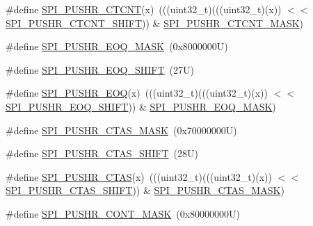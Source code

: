 \begin{DoxyCompactItemize}
\item 
\#define \mbox{\hyperlink{group___s_p_i___register___masks_ga4662cfbebbea26e0c427a9e4c310d9b2}{S\+P\+I\+\_\+\+P\+U\+S\+H\+R\+\_\+\+C\+T\+C\+NT}}(x)~(((uint32\+\_\+t)(((uint32\+\_\+t)(x)) $<$$<$ \mbox{\hyperlink{group___s_p_i___register___masks_ga7db8f0d7ae83f27f34eafd5e4d993ed1}{S\+P\+I\+\_\+\+P\+U\+S\+H\+R\+\_\+\+C\+T\+C\+N\+T\+\_\+\+S\+H\+I\+FT}})) \& \mbox{\hyperlink{group___s_p_i___register___masks_gad9e8859d590a59f5e208f5f4a2c8b873}{S\+P\+I\+\_\+\+P\+U\+S\+H\+R\+\_\+\+C\+T\+C\+N\+T\+\_\+\+M\+A\+SK}})
\item 
\#define \mbox{\hyperlink{group___s_p_i___register___masks_ga997edfebb20bfe6a385f018eb9a8a8fb}{S\+P\+I\+\_\+\+P\+U\+S\+H\+R\+\_\+\+E\+O\+Q\+\_\+\+M\+A\+SK}}~(0x8000000\+U)
\item 
\#define \mbox{\hyperlink{group___s_p_i___register___masks_ga81e193cbd4602af43cd59a35e56fa958}{S\+P\+I\+\_\+\+P\+U\+S\+H\+R\+\_\+\+E\+O\+Q\+\_\+\+S\+H\+I\+FT}}~(27\+U)
\item 
\#define \mbox{\hyperlink{group___s_p_i___register___masks_ga91c3110a4dbb544395f48a657b22dabe}{S\+P\+I\+\_\+\+P\+U\+S\+H\+R\+\_\+\+E\+OQ}}(x)~(((uint32\+\_\+t)(((uint32\+\_\+t)(x)) $<$$<$ \mbox{\hyperlink{group___s_p_i___register___masks_ga81e193cbd4602af43cd59a35e56fa958}{S\+P\+I\+\_\+\+P\+U\+S\+H\+R\+\_\+\+E\+O\+Q\+\_\+\+S\+H\+I\+FT}})) \& \mbox{\hyperlink{group___s_p_i___register___masks_ga997edfebb20bfe6a385f018eb9a8a8fb}{S\+P\+I\+\_\+\+P\+U\+S\+H\+R\+\_\+\+E\+O\+Q\+\_\+\+M\+A\+SK}})
\item 
\#define \mbox{\hyperlink{group___s_p_i___register___masks_ga3ac8018fdfe57c16da2782e99232ae45}{S\+P\+I\+\_\+\+P\+U\+S\+H\+R\+\_\+\+C\+T\+A\+S\+\_\+\+M\+A\+SK}}~(0x70000000\+U)
\item 
\#define \mbox{\hyperlink{group___s_p_i___register___masks_ga16a0810e65793ba9f24a5ae8be8cf49a}{S\+P\+I\+\_\+\+P\+U\+S\+H\+R\+\_\+\+C\+T\+A\+S\+\_\+\+S\+H\+I\+FT}}~(28\+U)
\item 
\#define \mbox{\hyperlink{group___s_p_i___register___masks_gadc43fdbca4e34579e7ede4ac104c7ae5}{S\+P\+I\+\_\+\+P\+U\+S\+H\+R\+\_\+\+C\+T\+AS}}(x)~(((uint32\+\_\+t)(((uint32\+\_\+t)(x)) $<$$<$ \mbox{\hyperlink{group___s_p_i___register___masks_ga16a0810e65793ba9f24a5ae8be8cf49a}{S\+P\+I\+\_\+\+P\+U\+S\+H\+R\+\_\+\+C\+T\+A\+S\+\_\+\+S\+H\+I\+FT}})) \& \mbox{\hyperlink{group___s_p_i___register___masks_ga3ac8018fdfe57c16da2782e99232ae45}{S\+P\+I\+\_\+\+P\+U\+S\+H\+R\+\_\+\+C\+T\+A\+S\+\_\+\+M\+A\+SK}})
\item 
\#define \mbox{\hyperlink{group___s_p_i___register___masks_gac28b0accd475a1a991ccece8d1333ae0}{S\+P\+I\+\_\+\+P\+U\+S\+H\+R\+\_\+\+C\+O\+N\+T\+\_\+\+M\+A\+SK}}~(0x80000000\+U)
$$
\end{DoxyCompactItemize}
